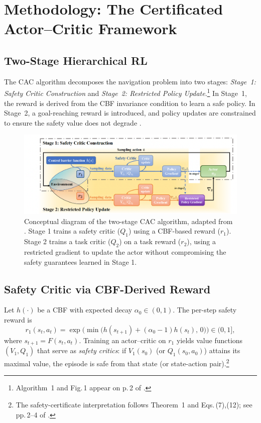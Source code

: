 \documentclass[10pt,conference]{IEEEtran}
\begin{document}
\section{Methodology: The Certificated Actor--Critic Framework}
\subsection{Two-Stage Hierarchical RL}
The CAC algorithm decomposes the navigation problem into two stages: \emph{Stage~1: Safety Critic Construction} and \emph{Stage~2: Restricted Policy Update}.\footnote{Algorithm~1 and Fig.\,1 appear on p.\,2 of \cite{Xie2025CAC}.} In Stage~1, the reward is derived from the CBF invariance condition to learn a safe policy. In Stage~2, a goal-reaching reward is introduced, and policy updates are constrained to ensure the safety value does not degrade \cite{Xie2025CAC}.

\begin{figure}[t]
    \centering
    \includegraphics[width=\columnwidth]{images/CAC_framework.png} 
    \caption{Conceptual diagram of the two-stage CAC algorithm, adapted from \cite{Xie2025CAC}. Stage 1 trains a safety critic ($Q_1$) using a CBF-based reward ($r_1$). Stage 2 trains a task critic ($Q_2$) on a task reward ($r_2$), using a restricted gradient to update the actor without compromising the safety guarantees learned in Stage 1.}
    \label{fig:framework}
\end{figure}

\subsection{Safety Critic via CBF-Derived Reward}
Let $h(\cdot)$ be a CBF with expected decay $\alpha_0\in(0,1)$. The per-step safety reward is
\begin{equation}
r_1(s_t,a_t)=\exp\Big(\min\big(h(s_{t+1})+(\alpha_0-1)h(s_t),\,0\big)\Big)\in(0,1],
\label{eq:cbf-reward}
\end{equation}
where $s_{t+1}=F(s_t,a_t)$. Training an actor--critic on $r_1$ yields value functions $(V_1,Q_1)$ that serve as \emph{safety critics}: if $V_1(s_0)$ (or $Q_1(s_0,a_0)$) attains its maximal value, the episode is safe from that state (or state-action pair).\footnote{The safety-certificate interpretation follows Theorem~1 and Eqs.\,(7),(12); see pp.\,2–4 of \cite{Xie2025CAC}.}
\end{document}

